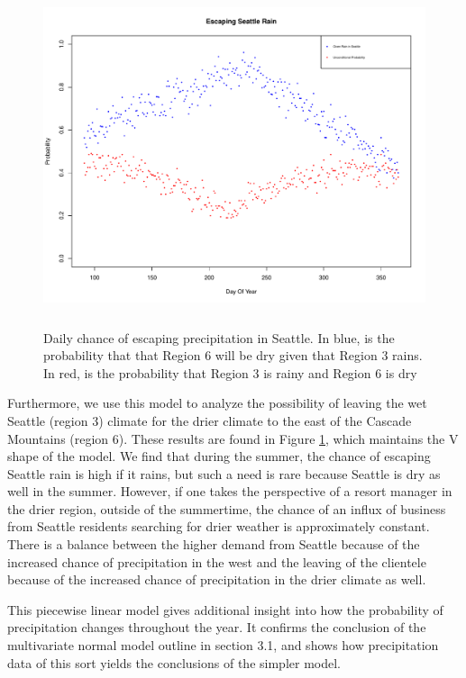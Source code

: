 \documentclass{article}
\begin{document}
\begin{figure}[H]
\centering
\includegraphics[width = .6\textwidth, height = 10cm]{Model2EscapeSeattleRain}
\caption{Daily chance of escaping precipitation in Seattle. In blue, is the probability that that Region 6 will be dry given that Region 3 rains. In red, is the probability that Region 3 is rainy and Region 6 is dry}
\label{fig:m2EscapeSeattle}
\end{figure}

Furthermore, we use this model to analyze the possibility of leaving the wet Seattle (region 3) climate for the drier climate to the east of the Cascade Mountains (region 6). These results are found in Figure \ref{fig:m2EscapeSeattle}, which maintains the V shape of the model. We find that during the summer, the chance of escaping Seattle rain is high if it rains, but such a need is rare because Seattle is dry as well in the summer. 
However, if one takes the perspective of a resort manager in the drier region, outside of the summertime, the chance of an influx of business from Seattle residents searching for drier weather is approximately constant. There is a balance between the higher demand from Seattle because of the increased chance of precipitation in the west and the leaving of the clientele because of the increased chance of precipitation in the drier climate as well.

This piecewise linear model gives additional insight into how the probability of precipitation changes throughout the year. It confirms the conclusion of the multivariate normal model outline in section 3.1, and shows how precipitation data of this sort yields the conclusions of the simpler model. 
\end{document}
